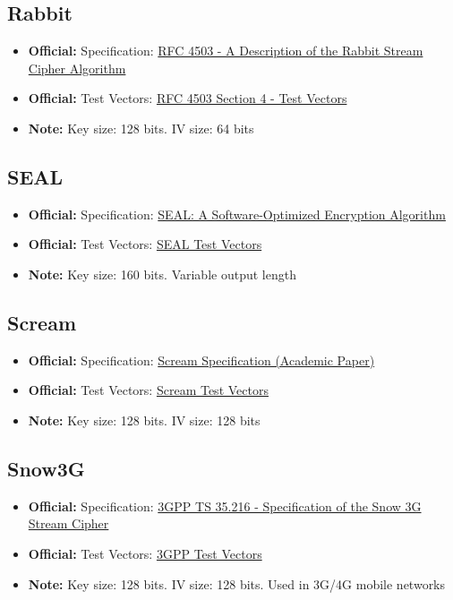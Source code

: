 \documentclass[12pt,a4paper]{article}
\newcommand{\official}[1]{\textcolor{citegreen}{\textbf{Official:}} #1}
\newcommand{\note}[1]{\textcolor{noteorange}{\textbf{Note:}} #1}
\newcommand{\link}[2]{\href{#1}{#2}}
\begin{document}
\subsection{Rabbit}
\begin{itemize}
    \item \official{Specification:} \link{https://tools.ietf.org/html/rfc4503}{RFC 4503 - A Description of the Rabbit Stream Cipher Algorithm}
    \item \official{Test Vectors:} \link{https://tools.ietf.org/html/rfc4503#section-4}{RFC 4503 Section 4 - Test Vectors}
    \item \note{Key size: 128 bits. IV size: 64 bits}
\end{itemize}

\subsection{SEAL}
\begin{itemize}
    \item \official{Specification:} \link{https://www.cs.ucdavis.edu/~rogaway/papers/seal.pdf}{SEAL: A Software-Optimized Encryption Algorithm}
    \item \official{Test Vectors:} \link{https://www.cs.ucdavis.edu/~rogaway/papers/seal.pdf}{SEAL Test Vectors}
    \item \note{Key size: 160 bits. Variable output length}
\end{itemize}

\subsection{Scream}
\begin{itemize}
    \item \official{Specification:} \link{https://eprint.iacr.org/2002/031.pdf}{Scream Specification (Academic Paper)}
    \item \official{Test Vectors:} \link{https://eprint.iacr.org/2002/031.pdf}{Scream Test Vectors}
    \item \note{Key size: 128 bits. IV size: 128 bits}
\end{itemize}

\subsection{Snow3G}
\begin{itemize}
    \item \official{Specification:} \link{https://www.gsma.com/security/security-algorithms/}{3GPP TS 35.216 - Specification of the Snow 3G Stream Cipher}
    \item \official{Test Vectors:} \link{https://www.gsma.com/security/security-algorithms/}{3GPP Test Vectors}
    \item \note{Key size: 128 bits. IV size: 128 bits. Used in 3G/4G mobile networks}
\end{itemize}
\end{document}
